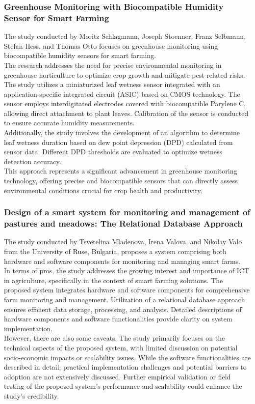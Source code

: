 \documentclass[12pt, a4paper]{article}
\begin{document}
\subsubsection{Greenhouse Monitoring with Biocompatible Humidity Sensor for Smart Farming}
The study conducted by Moritz Schlagmann, Joseph Stoenner, Franz Selbmann, Stefan Hess, and Thomas Otto \cite{schlagmann2023greenhouse} focuses on greenhouse monitoring using biocompatible humidity sensors for smart farming.\\
The research addresses the need for precise environmental monitoring in greenhouse horticulture to optimize crop growth and mitigate pest-related risks.\\
The study utilizes a miniaturized leaf wetness sensor integrated with an application-specific integrated circuit (ASIC) based on CMOS technology. The sensor employs interdigitated electrodes covered with biocompatible Parylene C, allowing direct attachment to plant leaves. Calibration of the sensor is conducted to ensure accurate humidity measurements.\\
Additionally, the study involves the development of an algorithm to determine leaf wetness duration based on dew point depression (DPD) calculated from sensor data. Different DPD thresholds are evaluated to optimize wetness detection accuracy.\\
This approach represents a significant advancement in greenhouse monitoring technology, offering precise and biocompatible sensors that can directly assess environmental conditions crucial for crop health and productivity.
 
 \subsubsection{Design of a smart system for monitoring and management of pastures and meadows: The Relational Database Approach}
The study conducted by Tsvetelina Mladenova, Irena Valova, and Nikolay Valo \cite{mladenova2022design} from the University of Ruse, Bulgaria, proposes a system comprising both hardware and software components for monitoring and managing smart farms.\\
In terms of pros, the study addresses the growing interest and importance of ICT in agriculture, specifically in the context of smart farming solutions. The proposed system integrates hardware and software components for comprehensive farm monitoring and management. Utilization of a relational database approach ensures efficient data storage, processing, and analysis. Detailed descriptions of hardware components and software functionalities provide clarity on system implementation.\\
However, there are also some caveats. The study primarily focuses on the technical aspects of the proposed system, with limited discussion on potential socio-economic impacts or scalability issues. While the software functionalities are described in detail, practical implementation challenges and potential barriers to adoption are not extensively discussed. Further empirical validation or field testing of the proposed system's performance and scalability could enhance the study's credibility.
\end{document}
